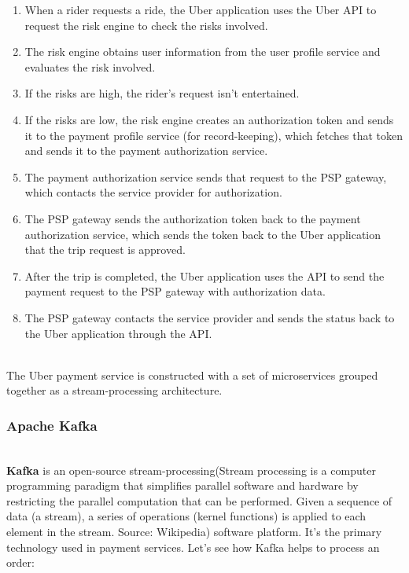 \begin{enumerate}
\item
\protect{}\label{__0vEhj7kyKc7SVByClOz}
When a rider requests a ride, the Uber application uses the Uber API to request the risk engine to check the risks involved.
\item
\protect{}\label{Ig_Mi90ZFOO5J_AseCwEP}
The risk engine obtains user information from the user profile service and evaluates the risk involved.
\item
\protect{}\label{CNm_4vzkkYkl2ViJA2qhe}
If the risks are high, the rider's request isn't entertained.
\item
\protect{}\label{KyG4HP3ztvC4pn8AMjmez}
If the risks are low, the risk engine creates an authorization token and sends it to the payment profile service (for record-keeping), which fetches that token and sends it to the payment authorization service.
\item
\protect{}\label{UhZv-2VJrrx5uI4OARESo}
The payment authorization service sends that request to the PSP gateway, which contacts the service provider for authorization.
\item
\protect{}\label{GzAGaSjzeASxGfrFR3PDe}
The PSP gateway sends the authorization token back to the payment authorization service, which sends the token back to the Uber application that the trip request is approved.
\item
\protect{}\label{aiwVrmMkV0IjOr8w-bdwR}
After the trip is completed, the Uber application uses the API to send the payment request to the PSP gateway with authorization data.
\item
\protect{}\label{MiGgmqyUtpg2qXAqtfqrm}
The PSP gateway contacts the service provider and sends the status back to the Uber application through the API.
\end{enumerate}
\\
The Uber payment service is constructed with a set of microservices grouped together as a stream-processing architecture.

\subsubsection{Apache Kafka}\label{PAG7v7LC-1WjaGss2nSrT}
\\
\textbf{Kafka} is an open-source stream-processing(Stream processing is a computer programming paradigm that simplifies parallel software and hardware by restricting the parallel computation that can be performed. Given a sequence of data (a stream), a series of operations (kernel functions) is applied to each element in the stream. Source: Wikipedia) software platform. It's the primary technology used in payment services. Let's see how Kafka helps to process an order:

